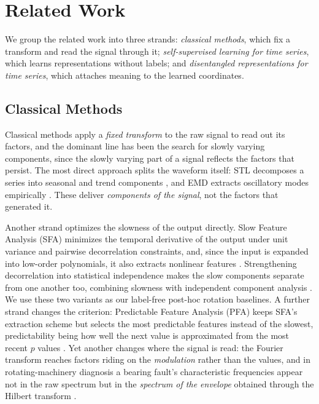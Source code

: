 \section{Related Work}

We group the related work into three strands: \emph{classical methods}, which
fix a transform and read the signal through it; \emph{self-supervised learning
for time series}, which learns representations without labels; and
\emph{disentangled representations for time series}, which attaches meaning to
the learned coordinates.

\subsection{Classical Methods}

Classical methods apply a \emph{fixed transform} to the raw signal to read out
its factors, and the dominant line has been the search for slowly varying
components, since the slowly varying part of a signal reflects the factors that
persist. The most direct approach splits the waveform itself: STL decomposes a
series into seasonal and trend components \cite{cleveland1990}, and EMD
extracts oscillatory modes empirically \cite{huang1998}. These deliver
\emph{components of the signal}, not the factors that generated it.

Another strand optimizes the slowness of the output directly. Slow Feature
Analysis (SFA) minimizes the temporal derivative of the output under unit
variance and pairwise decorrelation constraints, and, since the input is
expanded into low-order polynomials, it also extracts nonlinear features
\cite{wiskott2002}. Strengthening decorrelation into statistical independence
makes the slow components separate from one another too, combining slowness
with independent component analysis \cite{blaschke2007}. We use these two
variants as our label-free post-hoc rotation baselines. A further strand
changes the criterion: Predictable Feature Analysis (PFA) keeps SFA's
extraction scheme but selects the most predictable features instead of the
slowest, predictability being how well the next value is approximated from the
most recent $p$ values \cite{richthofer2013}. Yet another changes where the
signal is read: the Fourier transform reaches factors riding on the
\emph{modulation} rather than the values, and in rotating-machinery diagnosis a
bearing fault's characteristic frequencies appear not in the raw spectrum but
in the \emph{spectrum of the envelope} obtained through the Hilbert transform
\cite{randall2011}.

